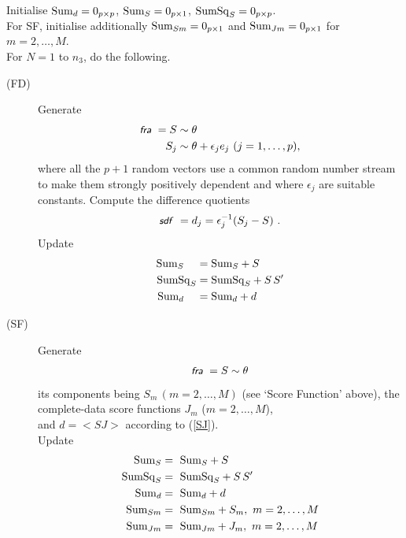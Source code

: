 \documentclass[a4paper,12pt,fleqn]{article}
\newcommand{\nnm}[1]{\textsf{\small\textit{#1}\ }}
\begin{document}
\begin{enumerate}
     Initialise ${{\rm{Sum}}}_{d} = 0_{p \times p}$,
           ${{\rm{Sum}}}_{S} = 0_{p \times 1}$,
           ${{\rm{SumSq}}}_{S} = 0_{p \times p}$.\\
     For SF, initialise additionally
              ${\rm{Sum}}_{Sm} = 0_{p \times 1}$ and
              ${\rm{Sum}}_{Jm} = 0_{p \times 1}$ for $m = 2, \ldots, M$.\\
     For $N = 1$ to $n_3$, do the following.
     \begin{description}
     \item[(FD)] Generate
     \begin{align*}
       \nnm{fra} {} = S & \sim \theta  \\
         S_{j} & \sim \theta + \epsilon_j e_j \ (j = 1, \ldots, p),
     \end{align*}
      where all the $p+1$ random vectors
      use a common random number stream to make them strongly positively
      dependent and where $\epsilon_j$ are suitable constants.
      Compute the difference quotients
      \[
      \nnm{sdf} = d_{j} = \epsilon_j^{-1} (S_{j} - S) \ .
      \]
      Update
            \begin{align*}
            {\rm{Sum}}_{S}  \phantom{Sq} &= {\rm{Sum}}_{S} + S \\
            {\rm{SumSq}}_{S}  &= {\rm{SumSq}}_{S} + S\,S' \\
            {\rm{Sum}}_{d}  \phantom{Sq} &= {\rm{Sum}}_{d} + d \\
            \end{align*}
      \item[(SF)] Generate
           \[
           \nnm{fra} = S \sim \theta  \\
           \]
               its components being $S_m \, (m = 2, \ldots, M)$
               (see `Score Function' above),
               the complete-data score functions
               $J_{m}$ ($m = 2, \ldots, M$),\\
               and $d = <\!SJ\!>$ according to (\ref{SJ}).\\
               Update
               \begin{align*}
                {\rm{Sum}}_{S}   &= \ {\rm{Sum}}_{S} + S \\
                {\rm{SumSq}}_{S} &= \ {\rm{SumSq}}_{S} + S\,S' \\
                {\rm{Sum}}_{d}   &= \ {\rm{Sum}}_{d} + d \\
                {\rm{Sum}}_{Sm}  &= \ {\rm{Sum}}_{Sm} + S_m, \ m = 2, \ldots, M \\
                {\rm{Sum}}_{Jm}  &= \ {\rm{Sum}}_{Jm} + J_m, \ m = 2, \ldots, M \\
               \end{align*}
     \end{description}


\end{enumerate}
\end{document}
